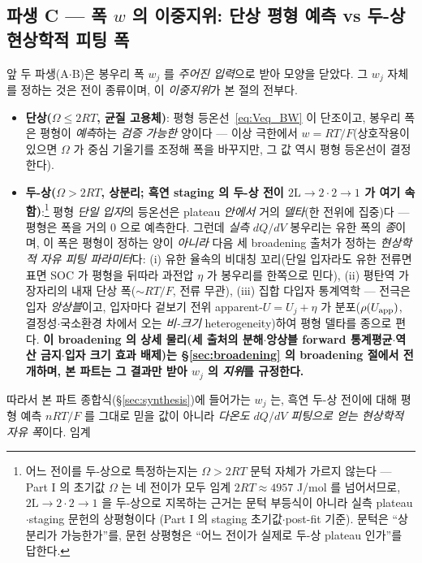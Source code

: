 \subsection{파생 C --- 폭 $w$ 의 이중지위: 단상 평형 예측 vs 두-상 현상학적 피팅 폭}\label{ssec:weff}
앞 두 파생(A$\cdot$B)은 봉우리 폭 $w_j$ 를 \emph{주어진 입력}으로 받아 모양을 닫았다. 그 $w_j$ 자체를 정하는
것은 전이 종류이며, 이 \emph{이중지위}가 본 절의 전부다.
\begin{itemize}[leftmargin=1.4em,itemsep=2pt]
\item \textbf{단상($\Omega\le2RT$, 균질 고용체)}: 평형 등온선~\eqref{eq:Veq_BW} 이 단조이고, 봉우리 폭은 평형이
\emph{예측}하는 \emph{검증 가능한} 양이다 --- 이상 극한에서 $w=RT/F$(상호작용이 있으면 $\Omega$ 가 중심
기울기를 조정해 폭을 바꾸지만, 그 값 역시 평형 등온선이 결정한다).
\item \textbf{두-상($\Omega>2RT$, 상분리; 흑연 staging 의 두-상 전이 $2\mathrm L\!\to\!2\cdot2\!\to\!1$ 가 여기
속함)}:\footnote{어느 전이를 두-상으로 특정하는지는 $\Omega>2RT$ 문턱 자체가 가르지 않는다 --- Part I 의
초기값 $\Omega$ 는 네 전이가 모두 임계 $2RT\approx4957$ J/mol 를 넘어서므로, $2\mathrm L\!\to\!2\cdot2\!\to\!1$
을 두-상으로 지목하는 근거는 문턱 부등식이 아니라 실측 plateau$\cdot$staging 문헌의 상평형이다
\cite{dahn1991,ohzuku1993}(Part I 의 staging 초기값$\cdot$post-fit 기준). 문턱은 ``상분리가 가능한가''를, 문헌 상평형은 ``어느 전이가 실제로 두-상
plateau 인가''를 답한다.} 평형 \emph{단일 입자}의 등온선은 plateau \emph{안에서} 거의 \emph{델타}(한 전위에 집중)다 --- 평형은
폭을 거의 $0$ 으로 예측한다. 그런데 \emph{실측} $dQ/dV$ 봉우리는 유한 폭의 \emph{종}이며, 이 폭은 평형이 정하는
양이 \emph{아니라} 다음 세 broadening 출처가 정하는 \emph{현상학적 자유 피팅 파라미터}다: (i) 유한 율속의
비대칭 꼬리(단일 입자라도 유한 전류면 표면 SOC 가 평형을 뒤따라 과전압 $\eta$ 가 봉우리를 한쪽으로 민다),
(ii) 평탄역 가장자리의 내재 단상 폭($\sim RT/F$, 전류 무관), (iii) 집합 다입자 통계역학 --- 전극은 입자
\emph{앙상블}이고, 입자마다 겉보기 전위 apparent-$U=U_j+\eta$ 가 분포($\rho(U_{\mathrm{app}})$, 결정성$\cdot$국소환경
차에서 오는 \emph{비-크기} heterogeneity)하여 평형 델타를 종으로 편다. \textbf{이 broadening 의 상세 물리(세
출처의 분해$\cdot$앙상블 forward 통계평균$\cdot$역산 금지$\cdot$입자 크기 효과 배제)는 \S\ref{sec:broadening} 의
broadening 절에서 전개하며, 본 파트는 그 결과만 받아 $w_j$ 의 \emph{지위}를 규정한다.}
\end{itemize}
따라서 본 파트 종합식(\S\ref{sec:synthesis})에 들어가는 $w_j$ 는, 흑연 두-상 전이에 대해 평형 예측
$nRT/F$ 를 그대로 믿을 값이 아니라 \emph{다온도 $dQ/dV$ 피팅으로 얻는 현상학적 자유 폭}이다. 임계
